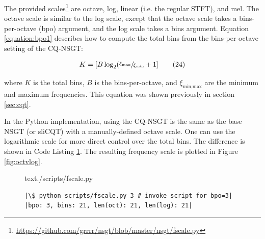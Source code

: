 \documentclass[report.tex]{subfiles}
\begin{document}
The provided scales\footnote{\url{https://github.com/grrrr/nsgt/blob/master/nsgt/fscale.py}} are octave, log, linear (i.e. the regular STFT), and mel. The octave scale is similar to the log scale, except that the octave scale takes a bins-per-octave (bpo) argument, and the log scale takes a bins argument. Equation \eqref{equation:bpo1} describes how to compute the total bins from the bins-per-octave setting of the CQ-NSGT:

\begin{align}
	K = [B \log_{2}(\sfrac{\xi_{\text{max}}}{\xi_{\text{min}}} + 1]\tag{24}\label{equation:bpo1}
\end{align}

where $K$ is the total bins, $B$ is the bins-per-octave, and $\xi_{\text{min,max}}$ are the minimum and maximum frequencies. This equation was shown previously in section \ref{sec:cqt}.

In the Python implementation, using the CQ-NSGT is the same as the base NSGT (or sliCQT) with a manually-defined octave scale. One can use the logarithmic scale for more direct control over the total bins. The difference is shown in Code Listing \ref{code:octvlog}. The resulting frequency scale is plotted in Figure \ref{fig:octvlog}.

\begin{figure}[h]
  \centering
 \begin{minipage}{\textwidth}
  \centering
\setlength\partopsep{-\topsep}
\begin{inputminted}[linenos,breaklines,frame=single,firstline=4,lastline=16,fontsize=\scriptsize]{text}{./scripts/fscale.py}
\end{inputminted}
 \vspace{1em}
 \end{minipage}
 \begin{minipage}{\textwidth}
  \centering
\begin{verbatim}
|\$ python scripts/fscale.py 3 # invoke script for bpo=3|
|bpo: 3, bins: 21, len(oct): 21, len(log): 21|
\end{verbatim}
 \end{minipage}
  \label{code:octvlog}
\end{figure}
\end{document}
